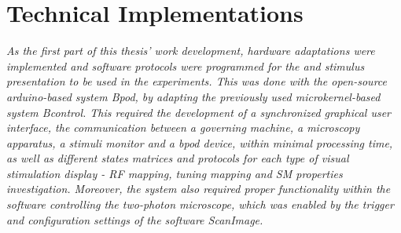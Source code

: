 
\chapter{Technical Implementations}
\label{cap:TechnicalImplementations}

\textit{As the first part of this thesis' work development, hardware adaptations were implemented and software protocols were programmed for the and stimulus presentation to be used in the experiments. This was done with the open-source arduino-based system Bpod, by adapting the previously used microkernel-based system Bcontrol. This required the development of a synchronized graphical user interface, the communication between a governing machine, a microscopy apparatus, a stimuli monitor and a bpod device, within minimal processing time, as well as different states matrices and protocols for each type of visual stimulation display - RF mapping, tuning mapping and SM properties investigation. %
Moreover, the system also required proper functionality within the software controlling the two-photon microscope, which was enabled by the trigger and configuration settings of the software ScanImage.}




%
%
%
